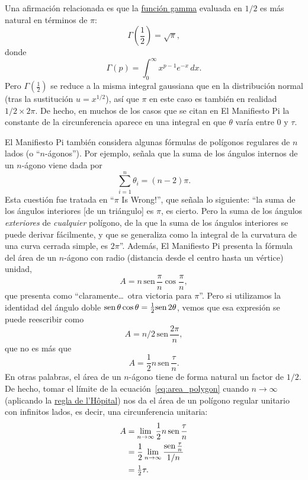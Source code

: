 Una afirmación relacionada es que la \href{http://mathworld.wolfram.com/GammaFunction.html}{función gamma} evaluada en $1/2$ es más natural en términos de $\pi$:
\[
\Gamma(\textstyle{\frac{1}{2}}) = \sqrt{\pi},
\]
donde
\begin{equation}
\label{eq:gamma}
\Gamma(p) = \int_{0}^{\infty} x^{p-1} e^{-x}\,dx.
\end{equation}
Pero $\Gamma(\frac{1}{2})$ se reduce a la misma integral gaussiana que en la distribución normal (tras la sustitución $u = x^{1/2}$), así que $\pi$ en este caso es también en realidad $1/2\times 2\pi$. De hecho, en muchos de los casos que se citan en El Manifiesto Pi la constante de la circunferencia aparece en una integral en que $\theta$ varía entre $0$ y $\tau$.

El Manifiesto Pi también considera algunas fórmulas de polígonos regulares de $n$ lados (o ``$n$-ágonos''). Por ejemplo, señala que la suma de los ángulos internos de un $n$-ágono viene dada por
\[
\sum_{i=1}^n \theta_i=(n-2)\pi.
\]
Esta cuestión fue tratada en ``$\pi$ Is Wrong!'', que señala lo siguiente: ``la suma de los ángulos interiores [de un triángulo] es $\pi$, es cierto. Pero la suma de los ángulos \emph{exteriores} de \emph{cualquier} polígono, de la que la suma de los ángulos interiores se puede derivar fácilmente, y que se generaliza como la integral de la curvatura de una curva cerrada simple, es $2\pi$''. Además, El Manifiesto Pi presenta la fórmula del área de un $n$-ágono con radio (distancia desde el centro hasta un vértice) unidad,
\[ A=n\,\mbox{sen}\,\frac{\pi}{n}\cos\frac{\pi}{n}, \]
que presenta como ``claramente\ldots\ otra victoria para $\pi$''. Pero si utilizamos la identidad del ángulo doble $\mbox{sen}\,\theta\cos\theta = \frac{1}{2} \mbox{sen}\, 2\theta$, vemos que esa expresión se puede reescribir como
\[ A = n/2\, \mbox{sen}\,\frac{2\pi}{n}, \]
que no es más que
\begin{equation}
\label{eq:area_polygon}
A = \frac{1}{2} n\, \mbox{sen}\,\frac{\tau}{n}.
\end{equation}
En otras palabras, el área de un $n$-ágono tiene de forma natural un factor de $1/2.$ De hecho, tomar el límite de la ecuación~\eqref{eq:area_polygon} cuando $n\rightarrow \infty$ (aplicando la \href{http://mathworld.wolfram.com/LHospitalsRule.html}{regla de l'H\^{o}pital}) nos da el área de un polígono regular unitario con infinitos lados, es decir, una circunferencia unitaria:
\begin{equation}
\label{eq:lhopital}
\begin{split}
A & = \lim_{n\rightarrow\infty} \frac{1}{2} n\, \mbox{sen}\,\frac{\tau}{n} \\
  & = \frac{1}{2} \lim_{n\rightarrow\infty} \frac{\mbox{sen}\,\frac{\tau}{n}}{1/n} \\
  & = \tfrac{1}{2}\tau.
\end{split}
\end{equation}


